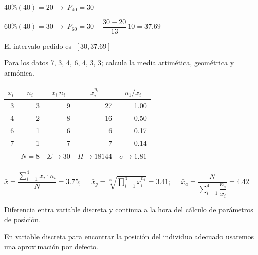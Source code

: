 $40\%(40)=20 \ \to \ P_{40}=30$

$60\%(40)=30 \ \to \ P_{60}=30+\dfrac{30-20}{13}\ 10=37.69$

El intervalo pedido es $\ [30,37.69]$

\vspace{5mm}%
\begin{ejemplo}
\begin{ejer}
	Para los datos 7, 3, 4, 6, 4, 3, 3; calcula la media artimética, geométrica y armónica.
\end{ejer}	
\end{ejemplo}

\begin{table}[H]
\centering
\begin{tabular}{rrrrr}
\multicolumn{1}{c}{\textbf{$x_i$}} & \multicolumn{1}{c}{\textbf{$n_i$}} & \multicolumn{1}{c}{\textbf{$x_i\ n_i$}} & \multicolumn{1}{c}{\textbf{$x_i^{n_i}$}} & \multicolumn{1}{c}{\textbf{$n_1/x_i$}} \\ \hline
\multicolumn{1}{|r|}{3} & \multicolumn{1}{r|}{3} & \multicolumn{1}{r|}{9} & \multicolumn{1}{r|}{27} & \multicolumn{1}{r|}{1.00} \\ \hline
\multicolumn{1}{|r|}{4} & \multicolumn{1}{r|}{2} & \multicolumn{1}{r|}{8} & \multicolumn{1}{r|}{16} & \multicolumn{1}{r|}{0.50} \\ \hline
\multicolumn{1}{|r|}{6} & \multicolumn{1}{r|}{1} & \multicolumn{1}{r|}{6} & \multicolumn{1}{r|}{6} & \multicolumn{1}{r|}{0.17} \\ \hline
\multicolumn{1}{|r|}{7} & \multicolumn{1}{r|}{1} & \multicolumn{1}{r|}{7} & \multicolumn{1}{r|}{7} & \multicolumn{1}{r|}{0.14} \\ \hline
\multicolumn{1}{l|}{} & \multicolumn{1}{l|}{$N=8$} & \multicolumn{1}{l|}{$\Sigma \to 30$} & \multicolumn{1}{l|}{$\Pi \to 18144$} & \multicolumn{1}{l|}{$\sigma \to 1.81$} \\ \cline{2-5} 
\end{tabular}
\end{table}

$\bar x=\dfrac{\displaystyle \sum_{i=1}^4 x_i \cdot n_i}{N}=3.75; \quad$
$\bar x_g=\sqrt[8] {\displaystyle \prod_{i=1}^4 x_i^{n_i}}=3.41; \quad$
$\bar x_a=\dfrac{N}{\displaystyle \sum_{i=1}^4 \dfrac{n_i}{x_i} }=4.42$

\vspace{0.5mm} %
\begin{destacado}
Diferencia entra variable discreta y continua a la hora del cálculo de parámetros de posición. 

En variable discreta para encontrar la posición del individuo adecuado usaremos una aproximación por defecto.	
\end{destacado}

